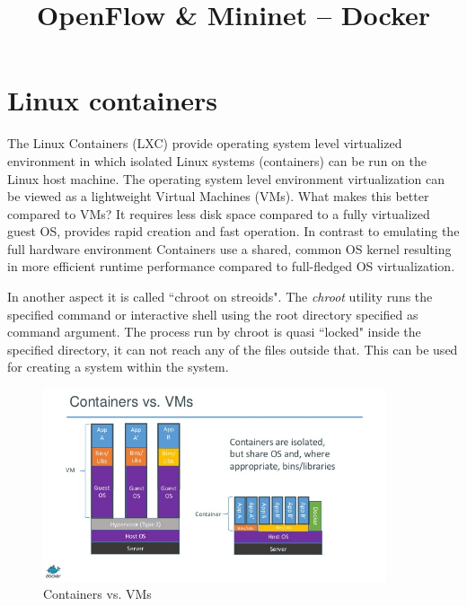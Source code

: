 \documentclass[a4paper]{article}
\title{OpenFlow \& Mininet – Docker}
\author{}
\date{}
\begin{document}
\maketitle

\tableofcontents

\section{Linux containers}
The Linux Containers (LXC) provide operating system level virtualized environment in which isolated Linux systems (containers) can be run on the Linux host machine. The operating system level environment virtualization can be viewed as a lightweight Virtual Machines (VMs). What makes this better compared to VMs? It requires less disk space compared to a fully virtualized guest OS, provides rapid creation and fast operation. In contrast to emulating the full hardware environment Containers use a shared, common OS kernel resulting in more efficient runtime performance compared to full-fledged OS virtualization.

In another aspect it is called ``chroot on streoids". The \emph{chroot} utility runs the specified command or interactive shell using the root directory specified as command argument. The process run by chroot is quasi ``locked" inside the specified directory, it can not reach any of the files outside that. This can be used for creating a system within the system.

\begin{figure}[H]
    \centering
    \includegraphics[width=0.9\textwidth]{figures/container_vs_vm.png}
    \caption{Containers vs. VMs}
    \label{fig:containers}
\end{figure}
\end{document}
